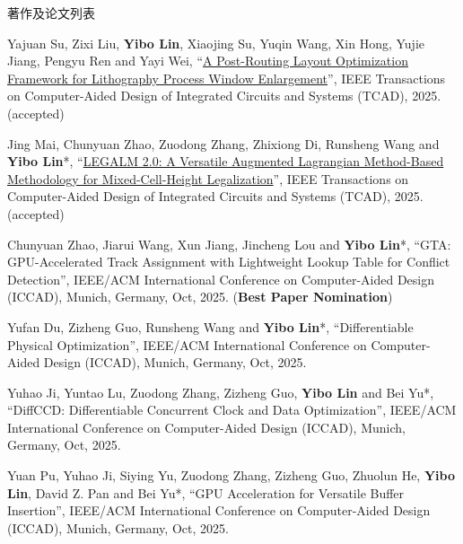 \begin{rSection}{著作及论文列表}
\begin{description}[font=\normalfont, rightmargin=2em]
\item[{[J201]}]{
        Yajuan Su, Zixi Liu, \textbf{Yibo Lin}, Xiaojing Su, Yuqin Wang, Xin Hong, Yujie Jiang, Pengyu Ren and Yayi Wei, 
    ``\href{https://doi.org/10.1109/TCAD.2025.3594247}{A Post-Routing Layout Optimization Framework for Lithography Process Window Enlargement}'', 
    IEEE Transactions on Computer-Aided Design of Integrated Circuits and Systems (TCAD), 2025.
    (accepted)
}
            

\item[{[J200]}]{
        Jing Mai, Chunyuan Zhao, Zuodong Zhang, Zhixiong Di, Runsheng Wang and \textbf{Yibo Lin}*, 
    ``\href{https://doi.org/10.1109/TCAD.2025.3597526}{LEGALM 2.0: A Versatile Augmented Lagrangian Method-Based Methodology for Mixed-Cell-Height Legalization}'', 
    IEEE Transactions on Computer-Aided Design of Integrated Circuits and Systems (TCAD), 2025.
    (accepted)
}
            

\item[{[C199]}]{
        Chunyuan Zhao, Jiarui Wang, Xun Jiang, Jincheng Lou and \textbf{Yibo Lin}*, 
    ``GTA: GPU-Accelerated Track Assignment with Lightweight Lookup Table for Conflict Detection'', 
    IEEE/ACM International Conference on Computer-Aided Design (ICCAD), Munich, Germany, Oct, 2025.
    (\textbf{Best Paper Nomination})
}
            

\item[{[C198]}]{
        Yufan Du, Zizheng Guo, Runsheng Wang and \textbf{Yibo Lin}*, 
    ``Differentiable Physical Optimization'', 
    IEEE/ACM International Conference on Computer-Aided Design (ICCAD), Munich, Germany, Oct, 2025.
    
}
            

\item[{[C197]}]{
        Yuhao Ji, Yuntao Lu, Zuodong Zhang, Zizheng Guo, \textbf{Yibo Lin} and Bei Yu*, 
    ``DiffCCD: Differentiable Concurrent Clock and Data Optimization'', 
    IEEE/ACM International Conference on Computer-Aided Design (ICCAD), Munich, Germany, Oct, 2025.
    
}
            

\item[{[C196]}]{
        Yuan Pu, Yuhao Ji, Siying Yu, Zuodong Zhang, Zizheng Guo, Zhuolun He, \textbf{Yibo Lin}, David Z. Pan and Bei Yu*, 
    ``GPU Acceleration for Versatile Buffer Insertion'', 
    IEEE/ACM International Conference on Computer-Aided Design (ICCAD), Munich, Germany, Oct, 2025.
    
}
            


\end{description}
\end{rSection}

